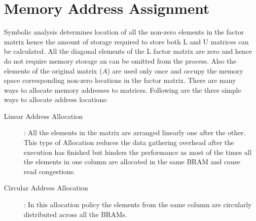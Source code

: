 \section{Memory Address Assignment}
Symbolic analysis determines location of all the non-zero elements in the factor matrix hence 
the amount of storage required to store both L and U matrices can be calculated. 
All the diagonal elements of the L factor matrix are zero and hence do not 
require memory storage an can be omitted from the process. Also the elements
of the original matrix ($A$) are used only once and occupy the memory space 
corresponding non-zero locations in the factor matrix. There are many ways to allocate memory addresses
to matrices. Following are the three simple ways to allocate address locations:
\begin{description}
    \item[Linear Address Allocation]: All the elements in the matrix are arranged linearly one after the other. This type of Allocation 
        reduces the data gathering overhead after the execution has finished but hinders the performance as most of the times all the elements 
        in one column are allocated in the same BRAM and cause read congestions.
    \item[Circular Address Allocation]: In this allocation policy the elements from the same column are circularly distributed 
        across all the BRAMs. 
\end{description}



